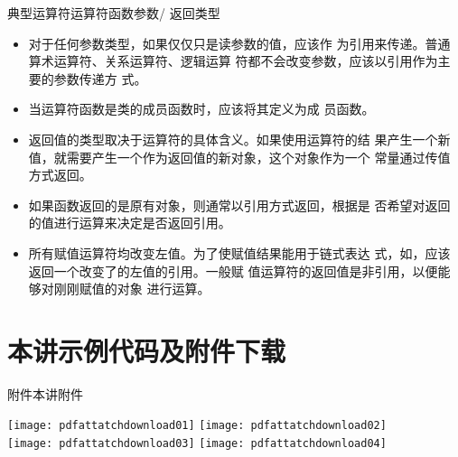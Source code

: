 \begin{frame}{典型运算符}{运算符函数参数/
    返回类型}%
  \stretchon
  \begin{itemize}
  \item 对于任何参数类型，如果\alert{仅仅只是读参数}的值，应该作
    为引用来传递。普通算术运算符、关系运算符、逻辑运算
    符都不会改变参数，应该以引用作为主要的参数传递方
    式。
  \item 当运算符函数是类的成员函数时，应该将其定义为成
    员函数。
  \item 返回值的类型取决于\alert{运算符的具体含义}。如果使用运算符的结
    果产生一个新值，就需要产生一个作为返回值的新对象，这个对象作为一个
    常量通过传值方式返回。
  \item \alert{如果函数返回的是原有对象，则通常以引用方式返回}，根据是
    否希望对返回的值进行运算来决定是否返回引用。
  \item 所有赋值运算符均改变左值。为了使赋值结果能用于\alert{链式表达
      式}，如，应该返回一个改变了的左值的引用。一般赋
    值运算符的返回值是非引用，以便能够对刚刚赋值的对象
    进行运算。
  \end{itemize}
  \stretchoff
\end{frame}

\section[附件下载]{本讲示例代码及附件下载} 
\begin{frame}{附件}{本讲附件}

  \vspace{-1ex}
  \begin{center}
    \texttt{[image: pdfattatchdownload01]}\quad
    \texttt{[image: pdfattatchdownload02]}\\[2ex]%
    \texttt{[image: pdfattatchdownload03]}\quad
    \texttt{[image: pdfattatchdownload04]}%
  \end{center}   
\end{frame}



